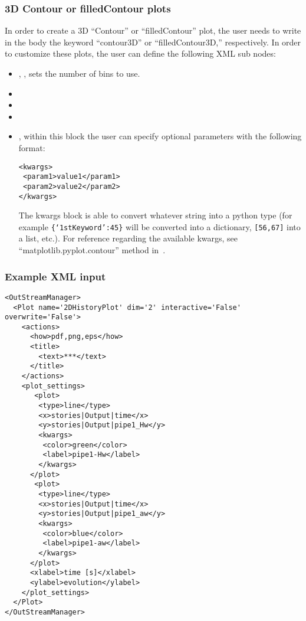 \subsubsection{3D Contour or filledContour plots}
In order to create a 3D ``Contour'' or ``filledContour'' plot, the user needs
to write in the  body the keyword ``contour3D'' or ``filledContour3D,'' respectively.
%
In order to customize these plots, the user can define the following XML sub
nodes:
\begin{itemize}
  \item {}, , sets the
  number of bins to use.
  \item {}
  \item {}
  \item {}
  \item {}, within this block the user can specify optional
  parameters with the following format:

\begin{lstlisting}[style=XML]
<kwargs>
 <param1>value1</param1>
 <param2>value2</param2>
</kwargs>
\end{lstlisting}

  The kwargs block is able to convert whatever string into a python type (for
  example \texttt{\{`1stKeyword':45\}} will
  be converted into a dictionary, 
  \texttt{[56,67]} into a list, etc.).
  For reference regarding the available kwargs, see
  ``matplotlib.pyplot.contour'' method in~\cite{MatPlotLib}.
\end{itemize}


\subsubsection{Example XML input}
\begin{lstlisting}[style=XML,morekeywords={name,dim,interactive,overwrite}]
<OutStreamManager>
  <Plot name='2DHistoryPlot' dim='2' interactive='False' overwrite='False'>
    <actions>
      <how>pdf,png,eps</how>
      <title>
        <text>***</text>
      </title>
    </actions>
    <plot_settings>
       <plot>
        <type>line</type>
        <x>stories|Output|time</x>
        <y>stories|Output|pipe1_Hw</y>
        <kwargs>
         <color>green</color>
         <label>pipe1-Hw</label>
        </kwargs>
      </plot>
       <plot>
        <type>line</type>
        <x>stories|Output|time</x>
        <y>stories|Output|pipe1_aw</y>
        <kwargs>
         <color>blue</color>
         <label>pipe1-aw</label>
        </kwargs>
      </plot>
      <xlabel>time [s]</xlabel>
      <ylabel>evolution</ylabel>
    </plot_settings>
  </Plot>
</OutStreamManager>
\end{lstlisting}
